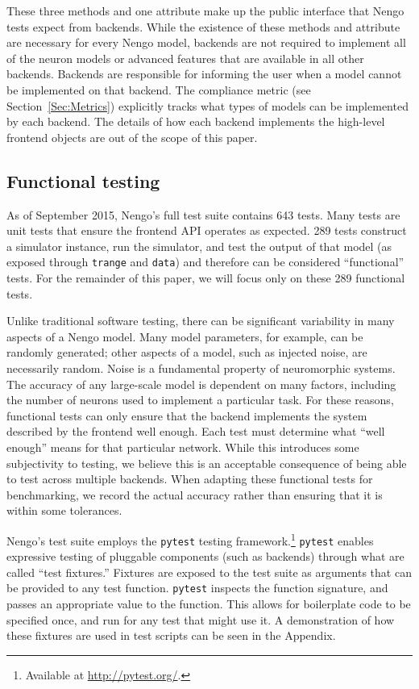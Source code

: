 \documentclass{frontiersSCNS}
\begin{document}
These three methods and one attribute
make up the public interface
that Nengo tests expect from backends.
While the existence of these methods
and attribute are necessary
for every Nengo model,
backends are not required
to implement all of the neuron models
or advanced features that
are available in all other backends.
Backends are responsible for informing
the user when a model cannot be implemented
on that backend.
The compliance metric (see Section~\ref{Sec:Metrics})
explicitly tracks what
types of models can be implemented
by each backend.
The details of how each backend
implements the high-level frontend objects
are out of the scope of this paper.

\subsection{Functional testing}

As of September 2015, Nengo's full test suite contains 643 tests.
Many tests are unit tests
that ensure the frontend API operates as expected.
289 tests construct a simulator instance,
run the simulator, and test the output of that model
(as exposed through \texttt{trange}
and \texttt{data})
and therefore can be considered ``functional'' tests.
For the remainder of this paper,
we will focus only on these 289 functional tests.

Unlike traditional software testing,
there can be significant variability
in many aspects of a Nengo model.
Many model parameters, for example,
can be randomly generated;
other aspects of a model,
such as injected noise,
are necessarily random.
Noise is a fundamental property
of neuromorphic systems.
The accuracy of any large-scale model
is dependent on many factors,
including the number of neurons used
to implement a particular task.
For these reasons,
functional tests can only
ensure that the backend implements
the system described by the frontend
well enough.
Each test must determine what
``well enough'' means for that particular network.
While this introduces some subjectivity
to testing,
we believe this is an acceptable consequence
of being able to test across multiple backends.
When adapting these functional tests for benchmarking,
we record the actual accuracy rather than
ensuring that it is within some tolerances.

Nengo's test suite employs the \texttt{pytest}
testing framework.\footnote{Available at \url{http://pytest.org/}.}
\texttt{pytest} enables
expressive testing of pluggable components
(such as backends)
through what are called ``test fixtures.''
Fixtures are exposed to the test suite
as arguments that can be provided
to any test function.
\texttt{pytest} inspects the function signature,
and passes an appropriate value
to the function.
This allows for boilerplate code
to be specified once,
and run for any test that might use it.
A demonstration of how these fixtures
are used in test scripts
can be seen in the Appendix.
\end{document}
